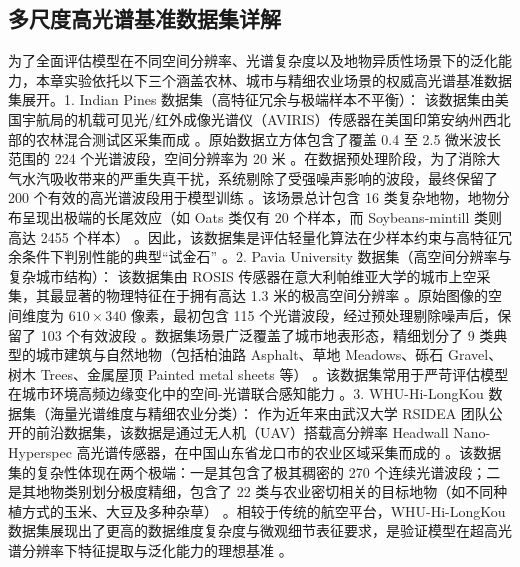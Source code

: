 \subsection{多尺度高光谱基准数据集详解}
为了全面评估模型在不同空间分辨率、光谱复杂度以及地物异质性场景下的泛化能力，本章实验依托以下三个涵盖农林、城市与精细农业场景的权威高光谱基准数据集展开。1. Indian Pines 数据集（高特征冗余与极端样本不平衡）：
该数据集由美国宇航局的机载可见光/红外成像光谱仪（AVIRIS）传感器在美国印第安纳州西北部的农林混合测试区采集而成 。原始数据立方体包含了覆盖 0.4 至 2.5 微米波长范围的 224 个光谱波段，空间分辨率为 20 米 。在数据预处理阶段，为了消除大气水汽吸收带来的严重失真干扰，系统剔除了受强噪声影响的波段，最终保留了 200 个有效的高光谱波段用于模型训练 。该场景总计包含 16 类复杂地物，地物分布呈现出极端的长尾效应（如 Oats 类仅有 20 个样本，而 Soybeans-mintill 类则高达 2455 个样本） 。因此，该数据集是评估轻量化算法在少样本约束与高特征冗余条件下判别性能的典型“试金石” 。2. Pavia University 数据集（高空间分辨率与复杂城市结构）：
该数据集由 ROSIS 传感器在意大利帕维亚大学的城市上空采集，其最显著的物理特征在于拥有高达 1.3 米的极高空间分辨率 。原始图像的空间维度为 $610 \times 340$ 像素，最初包含 115 个光谱波段，经过预处理剔除噪声后，保留了 103 个有效波段 。数据集场景广泛覆盖了城市地表形态，精细划分了 9 类典型的城市建筑与自然地物（包括柏油路 Asphalt、草地 Meadows、砾石 Gravel、树木 Trees、金属屋顶 Painted metal sheets 等） 。该数据集常用于严苛评估模型在城市环境高频边缘变化中的空间-光谱联合感知能力 。3. WHU-Hi-LongKou 数据集（海量光谱维度与精细农业分类）：
作为近年来由武汉大学 RSIDEA 团队公开的前沿数据集，该数据是通过无人机（UAV）搭载高分辨率 Headwall Nano-Hyperspec 高光谱传感器，在中国山东省龙口市的农业区域采集而成的 。该数据集的复杂性体现在两个极端：一是其包含了极其稠密的 270 个连续光谱波段；二是其地物类别划分极度精细，包含了 22 类与农业密切相关的目标地物（如不同种植方式的玉米、大豆及多种杂草） 。相较于传统的航空平台，WHU-Hi-LongKou 数据集展现出了更高的数据维度复杂度与微观细节表征要求，是验证模型在超高光谱分辨率下特征提取与泛化能力的理想基准 。

